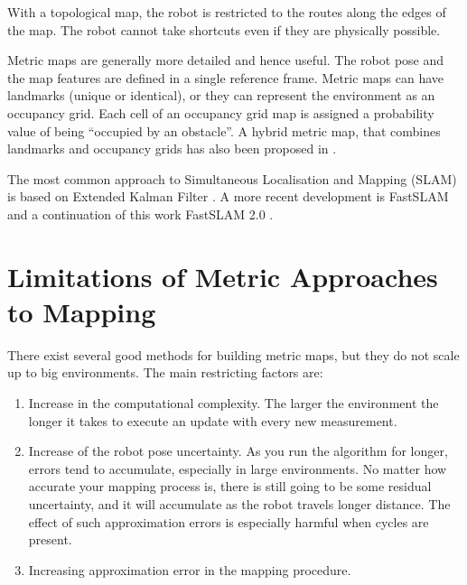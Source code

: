 With a topological map, the robot is restricted to the routes along
the edges of the map. The robot cannot take shortcuts even if they are
physically possible. 


Metric maps are generally more detailed and hence useful. 
The robot pose and the map features are defined in a single
reference frame. Metric maps can have landmarks (unique or identical),
or they can represent the environment as an occupancy grid. Each cell
of an occupancy grid map is assigned a probability value of being
``occupied by an obstacle''. A hybrid metric map, that combines
landmarks and occupancy grids has also been proposed in
\cite{guivant03}.  

The most common approach to Simultaneous Localisation and Mapping
(SLAM) is based on Extended Kalman Filter
\cite{ekf_slam,dissanayake01}. A more recent development is FastSLAM
\cite{fastslam,nieto2003} and a continuation of this work
FastSLAM 2.0 \cite{fastslam2}.



\section{Limitations of Metric Approaches to Mapping}


There exist several good methods for building metric maps, but they do
not scale up to big environments. The main restricting factors are:

\begin{enumerate}
 \item Increase in the computational complexity. The larger the
  environment the longer it takes to execute an update with every new
  measurement.

 \item Increase of the robot pose uncertainty. As you run the
 algorithm for longer, errors tend to accumulate, especially in large
 environments. No matter how accurate your mapping process is,
 there is still going to be some residual uncertainty, and it will
 accumulate as the robot travels longer distance. The effect of such approximation
 errors is especially harmful when cycles are present.

 \item Increasing approximation error in the mapping procedure.

\end{enumerate}

